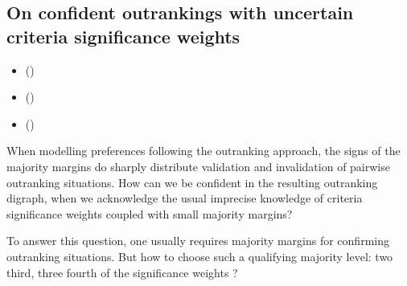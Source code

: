 \documentclass[a4paper,12pt,english]{sphinxhowto}
\begin{document}
\subsection{On confident outrankings with uncertain criteria significance weights}
\label{\detokenize{pearls:on-confident-outrankings-with-uncertain-criteria-significance-weights}}\label{\detokenize{pearls:bipolar-valued-likelihood-tutorial-label}}
\begin{sphinxcontents}
\begin{itemize}
\item {} 
\sphinxAtStartPar
{}\label{\detokenize{pearls:id109}}{\hyperref[\detokenize{pearls:modelling-uncertain-criteria-significance-weights}]{}} ()

\item {} 
\sphinxAtStartPar
{}\label{\detokenize{pearls:id110}}{\hyperref[\detokenize{pearls:bipolar-valued-likelihood-of-at-least-as-good-as-situations}]{}} ()

\item {} 
\sphinxAtStartPar
{}\label{\detokenize{pearls:id111}}{\hyperref[\detokenize{pearls:confidence-level-of-outranking-situations}]{}} ()

\end{itemize}
\end{sphinxcontents}

\sphinxAtStartPar
When modelling preferences following the outranking approach, the signs of the majority margins do sharply distribute validation and invalidation of pairwise outranking situations. How can we be confident in the resulting outranking digraph, when we acknowledge the usual imprecise knowledge of criteria significance weights coupled with small majority margins?

\sphinxAtStartPar
To answer this question, one usually requires  majority margins for confirming outranking situations. But how to choose such a qualifying majority level: two third, three fourth of the significance weights ?
\end{document}
